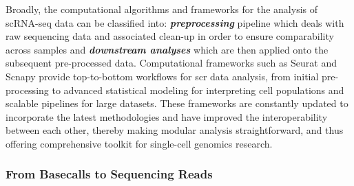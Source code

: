 \vspace{3mm}

\par Broadly, the computational algorithms and frameworks for the analysis of scRNA-seq data can be classified into: \textit{\textbf{preprocessing}} pipeline which deals with raw sequencing data and associated clean-up in order to ensure comparability across samples and \textbf{\textit{downstream analyses}} which are then applied onto the subsequent pre-processed data. Computational frameworks such as Seurat \textbf{\cite{butler_integrating_2018,stuart_comprehensive_2019,hao_integrated_2021}} and Scnapy \textbf{\cite{wolf_scanpy_2018}} provide top-to-bottom workflows for \gls{scr} data analysis, from initial pre-processing to advanced statistical modeling for interpreting cell populations and scalable pipelines for large datasets. These frameworks are constantly updated to incorporate the latest methodologies and have improved the interoperability between each other, thereby making modular analysis straightforward, and thus offering comprehensive toolkit for single-cell genomics research. 

\clearpage
\subsubsection{From Basecalls to Sequencing Reads}



